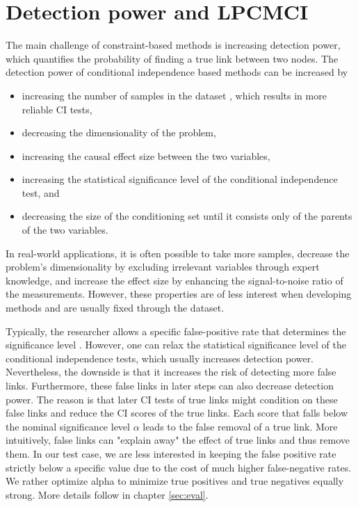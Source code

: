 \documentclass[conference]{IEEEtran}
\begin{document}
\section{Detection power and LPCMCI}
The main challenge of constraint-based methods is increasing detection power, which quantifies the probability of finding a true link between two nodes\cite{runge_pcmci_2019}.
The detection power of conditional independence based methods can be increased by
\begin{itemize}
    \item increasing the number of samples in the dataset \cite{gerhardus_high-recall_2021}, which results in more reliable CI tests,
    \item decreasing the dimensionality of the problem\cite{runge_pcmci_2019},
    \item increasing the causal effect size between the two variables\cite{gerhardus_high-recall_2021},
    \item increasing the statistical significance level of the conditional independence test\cite{gerhardus_high-recall_2021}, and
    \item decreasing the size of the conditioning set until it consists only of the parents of the two variables\cite{runge_pcmci_2019}.
\end{itemize}

In real-world applications, it is often possible to take more samples, decrease the problem's dimensionality by excluding irrelevant variables through expert knowledge, and increase the effect size by enhancing the signal-to-noise ratio of the measurements.
However, these properties are of less interest when developing methods and are usually fixed through the dataset.

Typically, the researcher allows a specific false-positive rate that determines the significance level \cite{gerhardus_high-recall_2021}.
However, one can relax the statistical significance level of the conditional independence tests, which usually increases detection power.
Nevertheless, the downside is that it increases the risk of detecting more false links.
Furthermore, these false links in later steps can also decrease detection power. The reason is that later CI tests of true links might condition on these false links and reduce the CI scores of the true links. Each score that falls below the nominal significance level $\alpha$ leads to the false removal of a true link. More intuitively, false links can "explain away" the effect of true links and thus remove them.
In our test case, we are less interested in keeping the false positive rate strictly below a specific value due to the cost of much higher false-negative rates. We rather optimize alpha to minimize true positives and true negatives equally strong. More details follow in chapter \ref{sec:eval}.
\end{document}
